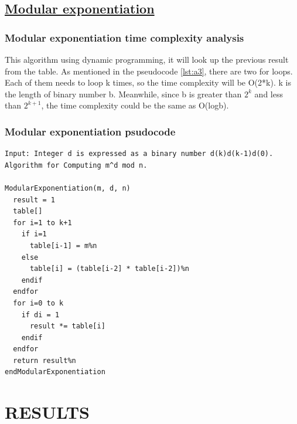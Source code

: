 \documentclass[12pt, oneside]{book}
\begin{document}
\section{\underline{Modular exponentiation}}
\subsection{Modular exponentiation time complexity analysis}
This algorithm using dynamic programming, it will look up the previous result from the table. As mentioned in the pseudocode \ref{lst:a3}, there are two for loops. Each of them needs to loop k times, so the time complexity will be O(2*k). k is the length of binary number b. Meanwhile, since b is greater than $2^k$ and less than $2^{k+1}$, the time complexity could be the same as O(logb).

\subsection{Modular exponentiation psudocode}
\begin{spacing}{1.0}
\begin{lstlisting}[label={lst:a3}, caption=Modular Exponentiation algorithm.]
Input: Integer d is expressed as a binary number d(k)d(k-1)d(0). Algorithm for Computing m^d mod n.

ModularExponentiation(m, d, n)
  result = 1
  table[]
  for i=1 to k+1
    if i=1
      table[i-1] = m%n
    else
      table[i] = (table[i-2] * table[i-2])%n
    endif
  endfor
  for i=0 to k
    if di = 1
      result *= table[i]
    endif
  endfor
  return result%n
endModularExponentiation 
\end{lstlisting}
\end{spacing}


\chapter{\textbf{RESULTS}}
\end{document}
